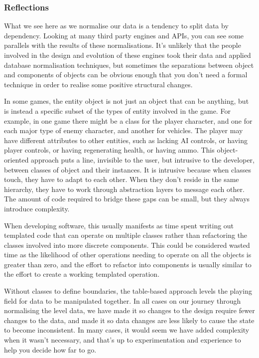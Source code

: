 \documentclass[a4paper,12pt]{article}
\begin{document}
\subsubsection{Reflections}

What we see here as we normalise our data is a tendency to split data by dependency.
Looking at many third party engines and APIs, you can see some parallels with the results of these normalisations.
It's unlikely that the people involved in the design and evolution of these engines took their data and applied database normalisation techniques, but sometimes the separations between object and components of objects can be obvious enough that you don't need a formal technique in order to realise some positive structural changes.

In some games, the entity object is not just an object that can be anything, but is instead a specific subset of the types of entity involved in the game.
For example, in one game there might be a class for the player character, and one for each major type of enemy character, and another for vehicles.
The player may have different attributes to other entities, such as lacking AI controls, or having player controls, or having regenerating health, or having ammo.
This object-oriented approach puts a line, invisible to the user, but intrusive to the developer, between classes of object and their instances.
It is intrusive because when classes touch, they have to adapt to each other.
When they don't reside in the same hierarchy, they have to work through abstraction layers to message each other.
The amount of code required to bridge these gaps can be small, but they always introduce complexity.

When developing software, this usually manifests as time spent writing out templated code that can operate on multiple classes rather than refactoring the classes involved into more discrete components.
This could be considered wasted time as the likelihood of other operations needing to operate on all the objects is greater than zero, and the effort to refactor into components is usually similar to the effort to create a working templated operation.

Without classes to define boundaries, the table-based approach levels the playing field for data to be manipulated together.
In all cases on our journey through normalising the level data, we have made it so changes to the design require fewer changes to the data, and made it so data changes are less likely to cause the state to become inconsistent.
In many cases, it would seem we have added complexity when it wasn't necessary, and that's up to experimentation and experience to help you decide how far to go.
\end{document}
